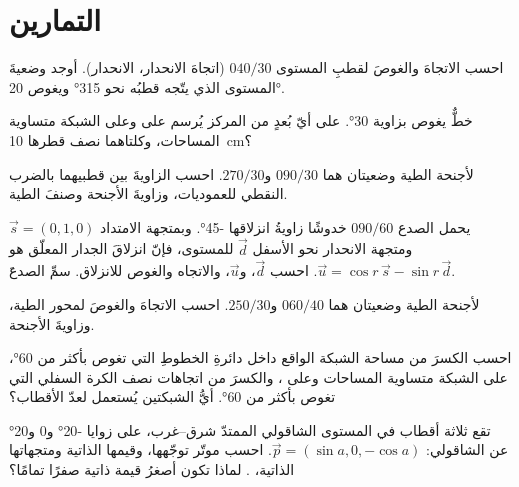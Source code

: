 \section{التمارين}

\begin{exercise}[$\star$]\label{exo:b3:structural-analysis:1}
احسب الاتجاهَ والغوصَ لقطبِ المستوى $040/30$ (اتجاهَ الانحدار،
الانحدار). أوجد وضعيةَ المستوى الذي يتّجه قطبُه نحو \ang{315} ويغوص
\ang{20}.
\end{exercise}

\begin{exercise}[$\star$]\label{exo:b3:structural-analysis:2}
خطٌّ يغوص بزاوية \ang{30}. على أيّ بُعدٍ من المركز يُرسم
على  وعلى الشبكة متساوية المساحات، وكلتاهما نصف قطرها \qty{10}{cm}؟
\end{exercise}

\begin{exercise}[$\star$]\label{exo:b3:structural-analysis:3}
لأجنحة الطية وضعيتان هما $090/30$ و$270/30$. احسب
الزاويةَ بين قطبيهما بالضرب النقطي للعموديات، وزاويةَ الأجنحة
وصنفَ الطية.
\end{exercise}

\begin{exercise}[$\star$]\label{exo:b3:structural-analysis:4}
يحمل الصدع $090/60$ خدوشًا زاويةُ انزلاقها \ang{-45}. وبمتجهة الامتداد
$\vec s = (0, 1, 0)$ ومتجهة الانحدار نحو الأسفل $\vec d$ للمستوى، فإنّ
انزلاقَ الجدار المعلّق هو $\vec u = \cos r\,\vec s - \sin r\,\vec d$. احسب
$\vec d$، و$\vec u$، والاتجاه والغوص للانزلاق. سمِّ الصدعَ.
\end{exercise}

\begin{exercise}[$\star\star$]\label{exo:b3:structural-analysis:5}
لأجنحة الطية وضعيتان هما $060/40$ و$250/30$. احسب
الاتجاهَ والغوصَ لمحور الطية، وزاويةَ الأجنحة.
\end{exercise}

\begin{exercise}[$\star\star$]\label{exo:b3:structural-analysis:6}
احسب الكسرَ من مساحة الشبكة الواقع داخل دائرةِ
الخطوطِ التي تغوص بأكثر من \ang{60}، على الشبكة متساوية المساحات وعلى ،
والكسرَ من اتجاهات نصف الكرة السفلي التي تغوص بأكثر
من \ang{60}. أيُّ الشبكتين يُستعمل لعدّ الأقطاب؟
\end{exercise}

\begin{exercise}[$\star\star$]\label{exo:b3:structural-analysis:7}
تقع ثلاثة أقطاب في المستوى الشاقولي الممتدّ شرق--غرب، على زوايا \ang{-20} و$0$
و\ang{20} عن الشاقولي: $\vec p = (\sin a, 0, -\cos a)$. احسب
موتّر توجّهها، وقيمها الذاتية ومتجهاتها الذاتية، . لماذا
تكون أصغرُ قيمة ذاتية صفرًا تمامًا؟
\end{exercise}

